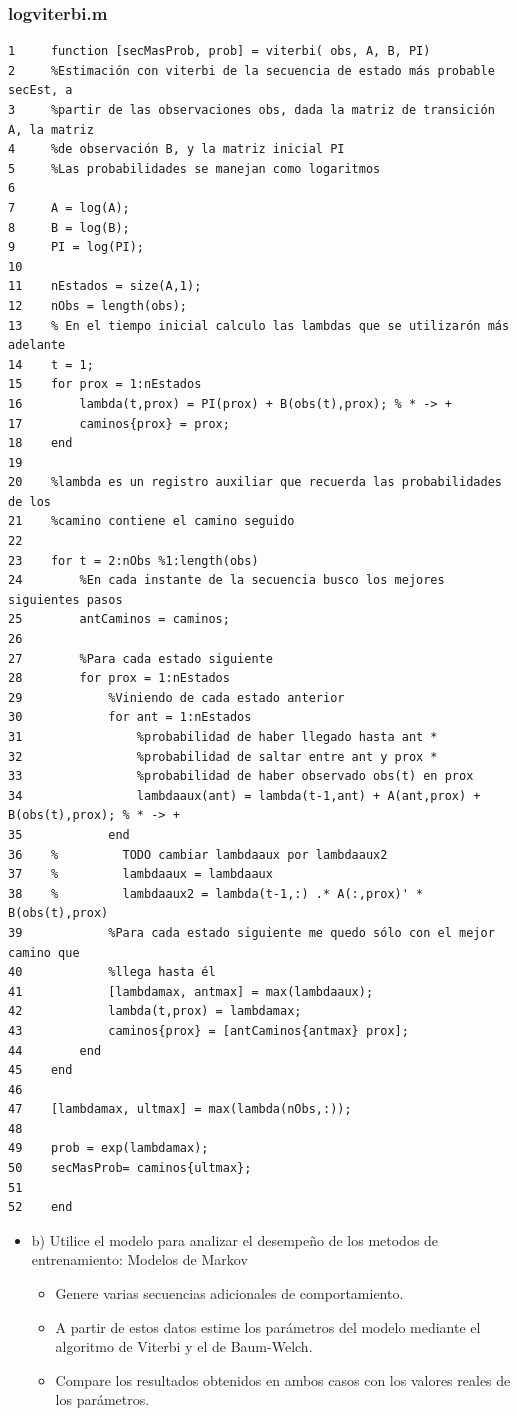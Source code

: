 \documentclass[11pt,a4paper,final]{article}
\begin{document}
\subsubsection*{logviterbi.m}
\begin{verbatim}
1     function [secMasProb, prob] = viterbi( obs, A, B, PI)
2     %Estimación con viterbi de la secuencia de estado más probable secEst, a 
3     %partir de las observaciones obs, dada la matriz de transición A, la matriz
4     %de observación B, y la matriz inicial PI
5     %Las probabilidades se manejan como logaritmos
6     
7     A = log(A);
8     B = log(B);
9     PI = log(PI);
10    
11    nEstados = size(A,1);
12    nObs = length(obs);
13    % En el tiempo inicial calculo las lambdas que se utilizarón más adelante
14    t = 1;
15    for prox = 1:nEstados
16        lambda(t,prox) = PI(prox) + B(obs(t),prox); % * -> +
17        caminos{prox} = prox;
18    end
19        
20    %lambda es un registro auxiliar que recuerda las probabilidades de los 
21    %camino contiene el camino seguido 
22    
23    for t = 2:nObs %1:length(obs)
24        %En cada instante de la secuencia busco los mejores siguientes pasos
25        antCaminos = caminos;
26        
27        %Para cada estado siguiente
28        for prox = 1:nEstados 
29            %Viniendo de cada estado anterior
30            for ant = 1:nEstados
31                %probabilidad de haber llegado hasta ant *
32                %probabilidad de saltar entre ant y prox *
33                %probabilidad de haber observado obs(t) en prox
34                lambdaaux(ant) = lambda(t-1,ant) + A(ant,prox) + B(obs(t),prox); % * -> +
35            end
36    %         TODO cambiar lambdaaux por lambdaaux2
37    %         lambdaaux = lambdaaux
38    %         lambdaaux2 = lambda(t-1,:) .* A(:,prox)' * B(obs(t),prox)
39            %Para cada estado siguiente me quedo sólo con el mejor camino que 
40            %llega hasta él
41            [lambdamax, antmax] = max(lambdaaux);
42            lambda(t,prox) = lambdamax;
43            caminos{prox} = [antCaminos{antmax} prox];
44        end
45    end
46    
47    [lambdamax, ultmax] = max(lambda(nObs,:));
48    
49    prob = exp(lambdamax);
50    secMasProb= caminos{ultmax};
51    
52    end
\end{verbatim}
\begin{itemize}

   \item b) Utilice el modelo para analizar el desempeño de los metodos de entrenamiento:
Modelos de Markov   
\begin{itemize}
 \item Genere varias secuencias adicionales de comportamiento.
   \item A partir de estos datos estime los parámetros del modelo mediante el algoritmo de Viterbi y el de Baum-Welch.
   \item Compare los resultados obtenidos en ambos casos con los valores  reales de los parámetros.
\end{itemize}
\end{itemize}
\end{document}
